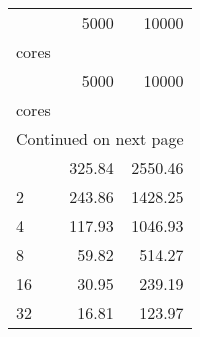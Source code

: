 \begin{longtable}{lrr}
	\timetable\\
\toprule
 & 5000 & 10000 \\
cores &  &  \\
\midrule
\endfirsthead
\toprule
 & 5000 & 10000 \\
cores &  &  \\
\midrule
\endhead
\midrule
\multicolumn{3}{r}{Continued on next page} \\
\midrule
\endfoot
\bottomrule
\endlastfoot
1 & 325.84 & 2550.46 \\
2 & 243.86 & 1428.25 \\
4 & 117.93 & 1046.93 \\
8 & 59.82 & 514.27 \\
16 & 30.95 & 239.19 \\
32 & 16.81 & 123.97 \\
\end{longtable}

